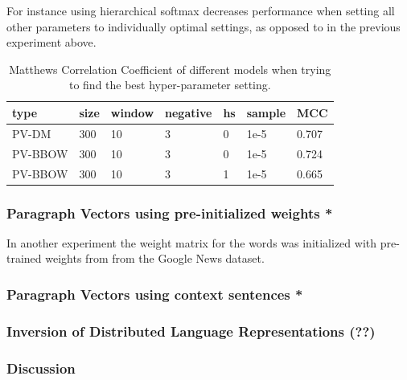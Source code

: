 For instance using hierarchical softmax decreases performance when setting all other parameters to individually optimal settings, as opposed to in the previous experiment above.

\begin{table}[h]
  \begin{center}
  \begin{tabular}{ *6l | l }
    \toprule
    type & size & window & negative & hs & sample & MCC  \\
    \midrule
    PV-DM & 300 & 10 & 3 & 0 & 1e-5 & 0.707 \\
    PV-BBOW & 300 & 10 & 3 & 0 & 1e-5 & 0.724 \\
    PV-BBOW & 300 & 10 & 3 & 1 & 1e-5 & 0.665 \\
    \bottomrule
  \end{tabular}
  \caption{Matthews Correlation Coefficient of different models when trying to find the best hyper-parameter setting.}
\label{tab:Paragraph Vector Parameter Results Best}
\end{center}
\end{table}

\subsubsection{Paragraph Vectors using pre-initialized weights *}

In another experiment the weight matrix for the words was initialized with pre-trained weights from from the Google News dataset.

\subsubsection{Paragraph Vectors using context sentences *}


\subsubsection{Inversion of Distributed Language Representations (??)}


\subsubsection{Discussion}


